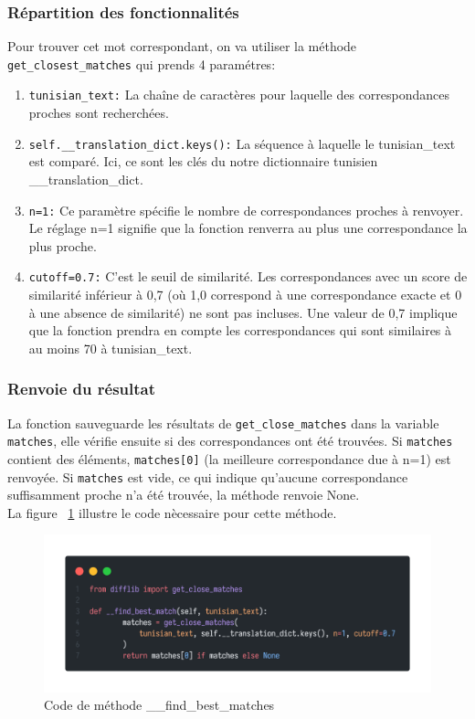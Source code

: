 \subsubsection{Répartition des fonctionnalités}
\noindent
Pour trouver cet mot correspondant, on va utiliser la méthode \\
\texttt{get\_closest\_matches} qui prends 4 paramétres:
\begin{enumerate}
	\item \texttt{tunisian\_text:} La chaîne de caractères pour laquelle des correspondances proches sont recherchées.
	\item \texttt{self.\_\_translation\_dict.keys():} La séquence à laquelle le tunisian\_text est comparé. Ici, ce sont les clés du notre dictionnaire tunisien \_\_translation\_dict.
	\item \texttt{n=1:} Ce paramètre spécifie le nombre de correspondances proches à renvoyer. Le réglage n=1 signifie que la fonction renverra au plus une correspondance la plus proche.
	\item \texttt{cutoff=0.7:} C'est le seuil de similarité. Les correspondances avec un score de similarité inférieur à 0,7 (où 1,0 correspond à une correspondance exacte et 0 à une absence de similarité) ne sont pas incluses. Une valeur de 0,7 implique que la fonction prendra en compte les correspondances qui sont similaires à au moins 70 à tunisian\_text.
\end{enumerate}

\subsubsection{Renvoie du résultat}
\noindent
La fonction sauveguarde les résultats de \texttt{get\_close\_matches} dans la variable \texttt{matches}, elle vérifie ensuite si des correspondances ont été trouvées. Si \texttt{matches} contient des éléments, \texttt{matches[0]} (la meilleure correspondance due à n=1) est renvoyée. Si \texttt{matches} est vide, ce qui indique qu'aucune correspondance suffisamment proche n'a été trouvée, la méthode renvoie None.\\ La figure ~\ref{fig:findbestmatch} illustre le code nècessaire pour cette méthode.

\begin{figure}[H]
	\centering
	\includegraphics[width=1\textwidth]{logos/findbestmatch.png}
	\caption{Code de méthode \_\_find\_best\_matches}
	\label{fig:findbestmatch}
\end{figure}

